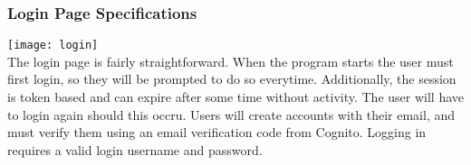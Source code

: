\subsubsection{Login Page Specifications}
\texttt{[image: login]}\\
The login page is fairly straightforward. When the program starts the user must first login, so they will be prompted to do so everytime. Additionally, the session is token based and can expire after some time without activity. The user will have to login again should this occru. Users will create accounts with their email, and must verify them using an email verification code from Cognito. Logging in requires a valid login username and password.\par
